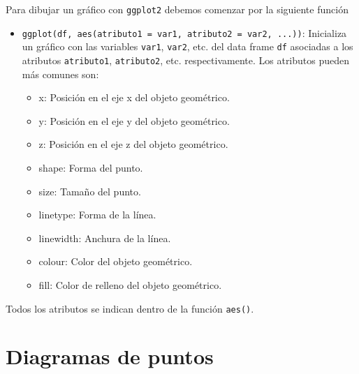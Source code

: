 \documentclass[
  spanish,
  a4paper,
]{scrreport}
\providecommand{\tightlist}{%
  \setlength{\itemsep}{0pt}\setlength{\parskip}{0pt}}
\theoremstyle{definition}
\theoremstyle{definition}
\theoremstyle{remark}
\begin{document}
Para dibujar un gráfico con \texttt{ggplot2} debemos comenzar por la
siguiente función

\begin{itemize}
\tightlist
\item
  \texttt{ggplot(df,\ aes(atributo1\ =\ var1,\ atributo2\ =\ var2,\ ...))}:
  Inicializa un gráfico con las variables \texttt{var1}, \texttt{var2},
  etc. del data frame \texttt{df} asociadas a los atributos
  \texttt{atributo1}, \texttt{atributo2}, etc. respectivamente. Los
  atributos pueden más comunes son:

  \begin{itemize}
  \tightlist
  \item
    x: Posición en el eje x del objeto geométrico.
  \item
    y: Posición en el eje y del objeto geométrico.
  \item
    z: Posición en el eje z del objeto geométrico.
  \item
    shape: Forma del punto.
  \item
    size: Tamaño del punto.
  \item
    linetype: Forma de la línea.
  \item
    linewidth: Anchura de la línea.
  \item
    colour: Color del objeto geométrico.
  \item
    fill: Color de relleno del objeto geométrico.
  \end{itemize}
\end{itemize}

\begin{tcolorbox}[enhanced jigsaw, arc=.35mm, bottomrule=.15mm, bottomtitle=1mm, breakable, colback=white, colbacktitle=quarto-callout-important-color!10!white, colframe=quarto-callout-important-color-frame, coltitle=black, left=2mm, leftrule=.75mm, opacityback=0, opacitybacktitle=0.6, rightrule=.15mm, title=\textcolor{quarto-callout-important-color}{\faExclamation}\hspace{0.5em}{Importante}, titlerule=0mm, toprule=.15mm, toptitle=1mm]

Todos los atributos se indican dentro de la función \texttt{aes()}.

\end{tcolorbox}

\section{Diagramas de puntos}\label{diagramas-de-puntos}
\end{document}
